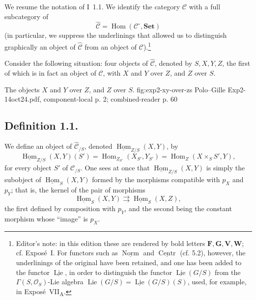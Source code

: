 We resume the notation of I~1.1. We identify the category \(\mathscr C\)
with a full subcategory of
\[
  \widehat{\mathscr C}
  =\operatorname{Hom}(\mathscr C^{\circ},\mathbf{Set})
\]
(in particular, we suppress the underlinings that allowed us to distinguish
graphically an object of \(\widehat{\mathscr C}\) from an object of
\(\mathscr C\)).\footnote{Editor's note: in this edition these are rendered
by bold letters \(\mathbf F,\mathbf G,\mathbf V,\mathbf W\); cf. Expos\'e~I.
For functors such as \(\underline{\operatorname{Norm}}\) and
\(\underline{\operatorname{Centr}}\) (cf. 5.2), however, the underlinings of
the original have been retained, and one has been added to the functor
\(\underline{\operatorname{Lie}}\), in order to distinguish the functor
\(\underline{\operatorname{Lie}}(G/S)\) from the
\(\Gamma(S,\mathcal O_S)\)-Lie algebra
\(\operatorname{Lie}(G/S)=\underline{\operatorname{Lie}}(G/S)(S)\), used,
for example, in Expos\'e~VII\textsubscript{A}.}

Consider the following situation: four objects of
\(\widehat{\mathscr C}\), denoted by \(S,X,Y,Z\), the first of which is in
fact an object of \(\mathscr C\), with \(X\) and \(Y\) over \(Z\), and
\(Z\) over \(S\).

  {The objects \(X\) and \(Y\) over \(Z\), and \(Z\) over \(S\).}
  {fig:exp2-xy-over-zs}
  {Polo--Gille Exp2-14oct24.pdf, component-local p. 2; combined-reader p. 60}

\subsection*{Definition 1.1.}
We define an object of \(\widehat{\mathscr C}_{/S}\), denoted
\(\underline{\operatorname{Hom}}_{Z/S}(X,Y)\), by
\begin{equation}
  \underline{\operatorname{Hom}}_{Z/S}(X,Y)(S')
  =\operatorname{Hom}_{Z_{S'}}(X_{S'},Y_{S'})
  =\operatorname{Hom}_{Z}(X\times_S S',Y),
  \tag{1}
\end{equation}
for every object \(S'\) of \(\mathscr C_{/S}\). One sees at once that
\(\underline{\operatorname{Hom}}_{Z/S}(X,Y)\) is simply the subobject of
\(\underline{\operatorname{Hom}}_S(X,Y)\) formed by the morphisms compatible
with \(p_X\) and \(p_Y\); that is, the kernel of the pair of morphisms
\[
  \underline{\operatorname{Hom}}_S(X,Y)
  \rightrightarrows
  \underline{\operatorname{Hom}}_S(X,Z),
\]
the first defined by composition with \(p_Y\), and the second being the
constant morphism whose ``image'' is \(p_X\).

